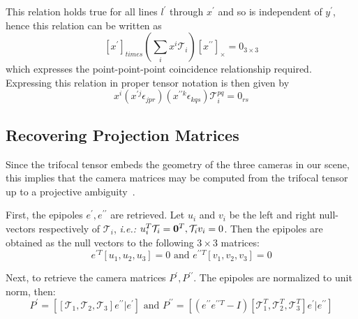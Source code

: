 This relation holds true for all lines $l^{\prime}$ through $x^{\prime}$ and so is independent of $y^{\prime}$, hence this relation can be written as
$$
[x^{\prime}]_{times} (\sum_{i} x^{i}\mathcal{T}_{i})[x^{\prime \prime}]_{\times} = 0_{3\times 3}
$$
which expresses the point-point-point coincidence relationship required. Expressing this relation in proper tensor notation is then given by
\begin{equation}
  x^{i}(x^{\prime j} \epsilon_{jpr})(x^{\prime \prime k} \epsilon_{kqs})\mathcal{T}^{pq}_{i} = 0_{rs} \label{eq:trifocalgeometry3}
\end{equation}

\subsection{Recovering Projection Matrices}
\label{sub:recovering_projection_matrices}
Since the trifocal tensor embeds the geometry of the three cameras in our scene, this implies that the camera matrices may be computed from the trifocal tensor up to a projective ambiguity~\cite{Hartley2004}.

First, the epipoles $e^{\prime},e^{\prime \prime}$ are retrieved. Let $u_i$ and $v_i$ be the left and right null-vectors respectively of $\mathcal{T}_{i}$, \textit{i.e.:} $u_{i}^{T} \mathcal{T}_{i} = {\bf 0}^{T}, \mathcal{T}_{i}v_i = 0$. Then the epipoles are obtained as the null vectors to the following $ 3 \times 3$ matrices:
\begin{equation}
  e^{\prime T} [u_1, u_2, u_3] = 0  \text{ and } e^{\prime \prime T}[v_1, v_2, v_3] = 0
\end{equation}

Next, to retrieve the camera matrices $P^{\prime}, P^{\prime \prime}$. The epipoles are normalized to unit norm, then:
\begin{equation}
  P^{\prime} = [[\mathcal{T}_{1}, \mathcal{T}_{2},\mathcal{T}_{3}] e^{\prime \prime} | e^{\prime}] \text{ and } P^{\prime \prime} = [(e^{\prime \prime} e^{\prime \prime T} - I)[\mathcal{T}_{1}^{T}, \mathcal{T}_{2}^{T},\mathcal{T}_{3}^{T}] e^{\prime} | e^{\prime \prime}]
\end{equation}


